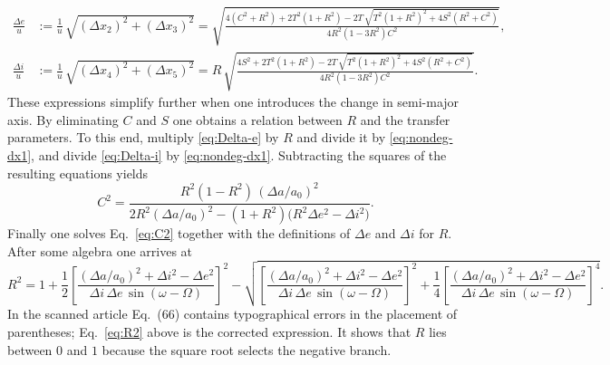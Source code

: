 \documentclass[12pt]{article}
\begin{document}
\begin{align}
  \frac{\Delta e}{u} &:= \frac{1}{u}\,\sqrt{(\Delta x_2)^2 + (\Delta x_3)^2}
    = \sqrt{\frac{4(C^2 + R^2) + 2 T^2 (1+R^2) - 2 T\,\sqrt{T^2 (1+R^2)^2 + 4 S^2 (R^2 + C^2)}}{4 R^2 (1-3R^2) C^2}},
    \tag{B11}\label{eq:Delta-e}\\
  \frac{\Delta i}{u} &:= \frac{1}{u}\,\sqrt{(\Delta x_4)^2 + (\Delta x_5)^2}
    = R\,\sqrt{\frac{4 S^2 + 2 T^2 (1+R^2) - 2 T\,\sqrt{T^2 (1+R^2)^2 + 4 S^2 (R^2 + C^2)}}{4 R^2 (1-3R^2) C^2}}.
    \tag{B12}\label{eq:Delta-i}
\end{align}
These expressions simplify further when one introduces the change in
semi-major axis.  By eliminating $C$ and $S$ one obtains a relation
between $R$ and the transfer parameters.  To this end, multiply
\eqref{eq:Delta-e} by $R$ and divide it by
\eqref{eq:nondeg-dx1}, and divide \eqref{eq:Delta-i} by
\eqref{eq:nondeg-dx1}.  Subtracting the squares of the resulting
equations yields
\begin{equation}
  C^2 = \frac{R^2 (1 - R^2)\,(\Delta a/a_0)^2}{2 R^2 (\Delta a/a_0)^2 - (1+R^2)
    \bigl(R^2 \Delta e^2 - \Delta i^2\bigr)}.
  \tag{B13}\label{eq:C2}
\end{equation}
Finally one solves Eq.~\eqref{eq:C2} together with the definitions of
$\Delta e$ and $\Delta i$ for $R$.  After some algebra one arrives at
\begin{equation}
  R^2 = 1 + \frac{1}{2}
    \left[\frac{(\Delta a/a_0)^2 + \Delta i^2 - \Delta e^2}
    {\Delta i\,\Delta e\,\sin(\omega - \Omega)}\right]^2
    -
    \sqrt{
      \left[\frac{(\Delta a/a_0)^2 + \Delta i^2 - \Delta e^2}
      {\Delta i\,\Delta e\,\sin(\omega - \Omega)}\right]^2
      + \frac{1}{4}
      \left[\frac{(\Delta a/a_0)^2 + \Delta i^2 - \Delta e^2}
      {\Delta i\,\Delta e\,\sin(\omega - \Omega)}\right]^4}
  .
  \tag{B14}\label{eq:R2}
\end{equation}
In the scanned article Eq.~(66) contains typographical errors in the
placement of parentheses; Eq.~\eqref{eq:R2} above is the corrected
expression.  It shows that $R$ lies between $0$ and $1$ because the
square root selects the negative branch.
\end{document}
